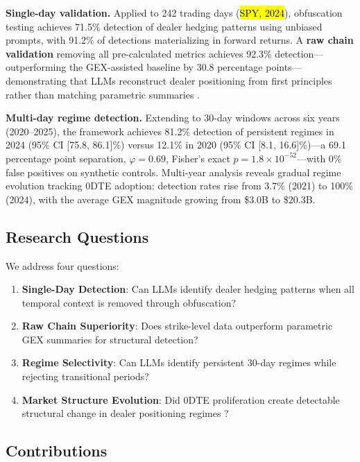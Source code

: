 \documentclass[jrfm,article,accept,moreauthors,pdftex]{Definitions/mdpi}
\begin{document}
\textbf{Single-day validation.} Applied to 242 trading days (\hl{SPY, 2024}), %
 obfuscation testing achieves 71.5\% detection of dealer hedging patterns using unbiased prompts, with 91.2\% of detections materializing in forward returns. A \textbf{raw chain validation} removing all pre-calculated metrics achieves 92.3\% detection---outperforming the GEX-assisted baseline by 30.8 percentage points---demonstrating that LLMs reconstruct dealer positioning from first principles rather than matching parametric summaries \citep{regan2025obfuscation}.

\textbf{Multi-day regime detection.} Extending to 30-day windows across six years \mbox{(2020--2025)}, the framework achieves 81.2\% detection of persistent regimes in 2024 (95\% CI [75.8, 86.1]\%) versus 12.1\% in 2020 (95\% CI [8.1, 16.6]\%)---a 69.1 percentage point separation, $\varphi = 0.69$, Fisher's exact $p = 1.8 \times 10^{-52}$---with 0\% false positives on synthetic controls. Multi-year analysis reveals gradual regime evolution tracking 0DTE adoption: detection rates rise from 3.7\% (2021) to 100\% (2024), with the average GEX magnitude growing from \$3.0B to \$20.3B.

\subsection{Research Questions}

We address four questions:
\begin{enumerate}
\item \textbf{Single-Day Detection}: Can LLMs identify dealer hedging patterns when all temporal context is removed through obfuscation?
\item \textbf{Raw Chain Superiority}: Does strike-level data outperform parametric GEX summaries for structural detection?
\item \textbf{Regime Selectivity}: Can LLMs identify persistent 30-day regimes while rejecting transitional periods?
\item \textbf{Market Structure Evolution}: Did 0DTE proliferation create detectable structural change in dealer positioning regimes \citep{adams2025zerodte}?
\end{enumerate}

\subsection{Contributions}
\end{document}
